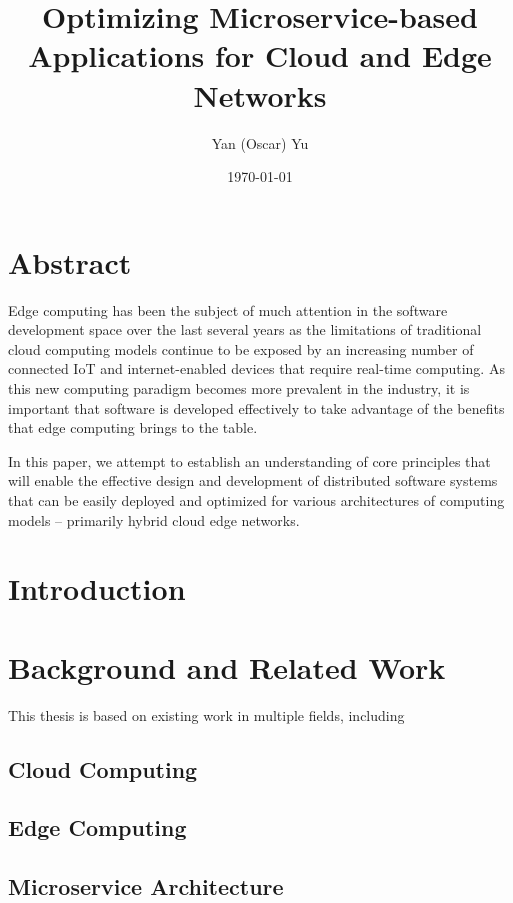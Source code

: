 \documentclass[11pt]{article}
\title{Optimizing Microservice-based Applications for Cloud and Edge Networks}
\author{Yan (Oscar) Yu}
\date{\today}
\begin{document}


\section*{Abstract}

Edge computing has been the subject of much attention in the software development space over the 
last several years as the limitations of traditional cloud computing models continue to be exposed 
by an increasing number of connected IoT and internet-enabled devices that require real-time 
computing. As this new computing paradigm becomes more prevalent in the industry, it is important 
that software is developed effectively to take advantage of the benefits that edge computing 
brings to the table.
\newline

In this paper, we attempt to establish an understanding of core principles that will enable the 
effective design and development of distributed software systems that can be easily deployed and 
optimized for various architectures of computing models -- primarily hybrid cloud edge networks.
\newline

\newpage
\tableofcontents

\newpage
\section{Introduction}

\newpage
\section{Background and Related Work}
This thesis is based on existing work in multiple fields, including 
\subsection{Cloud Computing}
\subsection{Edge Computing}
\subsection{Microservice Architecture}

\newpage
\end{document}
